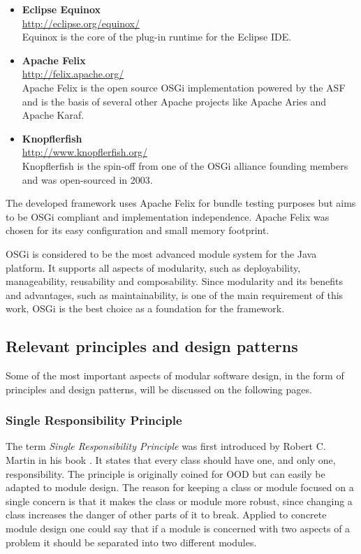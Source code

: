 \begin{itemize}
	\item \textbf{Eclipse Equinox} \\
		\url{http://eclipse.org/equinox/} \\
		Equinox is the core of the plug-in runtime for the Eclipse IDE.
	\item \textbf{Apache Felix} \\
		\url{http://felix.apache.org/} \\
		Apache Felix is the open source \gls{OSGi} implementation powered by the \gls{ASF} and is the basis of several other Apache projects like Apache Aries and Apache Karaf.
	\item \textbf{Knopflerfish} \\
		\url{http://www.knopflerfish.org/} \\
		Knopflerfish is the spin-off from one of the \gls{OSGi} alliance founding members and was open-sourced in 2003.
\end{itemize}

The developed framework uses Apache Felix for bundle testing purposes but aims to be \gls{OSGi} compliant and implementation independence. Apache Felix was chosen for its easy configuration and small memory footprint.

\gls{OSGi} is considered to be the most advanced module system for the Java platform. It supports all aspects of modularity, such as deployability, manageability, reusability and composability. Since modularity and its benefits and advantages, such as maintainability, is one of the main requirement of this work, \gls{OSGi} is the best choice as a foundation for the framework. 

\subsection{Relevant principles and design patterns}
Some of the most important aspects of modular software design, in the form of principles and design patterns, will be discussed on the following pages.

\subsubsection{Single Responsibility Principle}
The term \textit{Single Responsibility Principle} was first introduced by Robert C. Martin in his book  \cite{Martin:2002}. It states that every class should have one, and only one, responsibility. The principle is originally coined for \gls{OOD} but can easily be adapted to module design. The reason for keeping a class or module focused on a single concern is that it makes the class or module more robust, since changing a class increases the danger of other parts of it to break. Applied to concrete module design one could say that if a module is concerned with two aspects of a problem it should be separated into two different modules.

